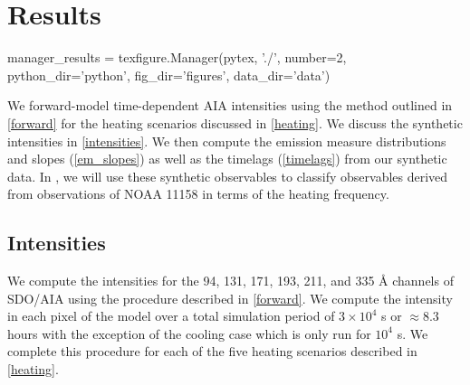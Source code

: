 \section{Results}\label{results}

\begin{pycode}
manager_results = texfigure.Manager(pytex, './', number=2, python_dir='python', fig_dir='figures', data_dir='data')
\end{pycode}

We forward-model time-dependent AIA intensities using the method outlined in \autoref{forward} for the heating scenarios discussed in \autoref{heating}. We discuss the synthetic intensities in \autoref{intensities}. We then compute the emission measure distributions and slopes (\autoref{em_slopes}) as well as the timelags (\autoref{timelags}) from our synthetic data. In , we will use these synthetic observables to classify observables derived from observations of NOAA 11158 in terms of the heating frequency.

\subsection{Intensities}\label{intensities}

We compute the intensities for the 94, 131, 171, 193, 211, and 335 \AA{} channels of SDO/AIA using the procedure described in \autoref{forward}. We compute the intensity in each pixel of the model \AR{} over a total simulation period of $3\times10^4$ s or $\approx8.3$ hours with the exception of the cooling case which is only run for $10^4$ s. We complete this procedure for each of the five heating scenarios described in \autoref{heating}.

